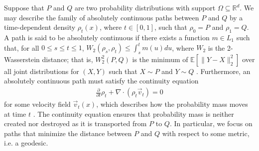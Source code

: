 \documentclass[11pt,twoside]{article}
\newcommand{\E}{\mathbb{E}}
\theoremstyle{definition}
\theoremstyle{remark}
\begin{document}
Suppose that $P$ and $Q$ are two probability distributions with support $\Omega \subseteq \mathbb{R}^d$. We may describe the family of absolutely continuous paths between $P$ and $Q$ by a time-dependent density $\rho_t(x)$, where $t \in [0, 1]$, such that $\rho_0 = P$ and $\rho_1 = Q$. A path is said to be absolutely continuous if there exists a function
$m\in L_1$ such that, for all $0 \leq s \leq t \leq 1$, $W_2(\rho_s,\rho_t)\leq \int_s^t m(u) du$, where $W_2$ is the 2-Wasserstein distance; that is, $W^2_2(P, Q)$ is the minimum of $\E[\|Y - X\|^2_2]$ over all joint distributions for $(X,Y)$ such that $X\sim P$ and $Y\sim Q$ \citep{Villani2009OptimalTransport}. Furthermore, an absolutely continuous path must satisfy the continuity equation
\begin{align} \label{continuity_equation}
    \frac{\partial}{\partial t} \rho_t + \nabla \cdot (\rho_t \vec{v}_t) = 0
\end{align}
for some velocity field $\vec{v}_t(x)$, which describes how the probability mass moves at time $t$ \citep{ambrosio2008gradient}.  The continuity equation ensures that probability mass is neither created nor destroyed as it is transported from $P$ to $Q$. In particular, we focus on paths that minimize the distance between $P$ and $Q$ with respect to some metric, i.e. a geodesic.
\end{document}
